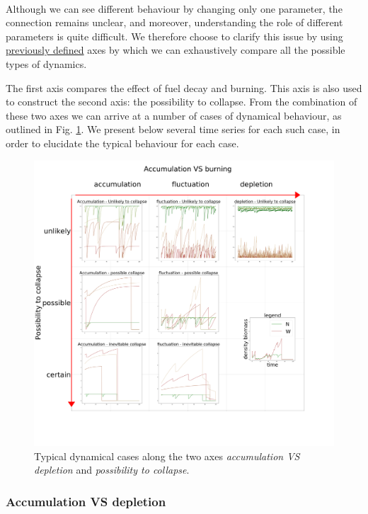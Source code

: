 \documentclass{article}
\begin{document}
\paragraph{}
Although we can see different behaviour by changing only one parameter, the connection remains unclear, and moreover, understanding the role of different parameters is quite difficult. We therefore choose to clarify this issue by using \hyperref[axes_definition]{previously defined} axes by which we can exhaustively compare all the possible types of dynamics.
    
The first axis compares the effect of fuel decay and burning. This axis is also used to construct the second axis: the possibility to collapse. From the combination of these two axes we can arrive at a number of cases of dynamical behaviour, as outlined in Fig. \ref{fig:universe}. We present below several time series for each such case, in order to elucidate the typical behaviour for each case.

\begin{figure}[h!]
\centering
\includegraphics[width=12cm]{results/time_series_each_cases.png}
\caption{Typical dynamical cases along the two axes \textit{accumulation VS depletion} and \textit{possibility to collapse}.}
\label{fig:universe}
\end{figure}

\newpage
\subsubsection{Accumulation VS depletion}
\end{document}

